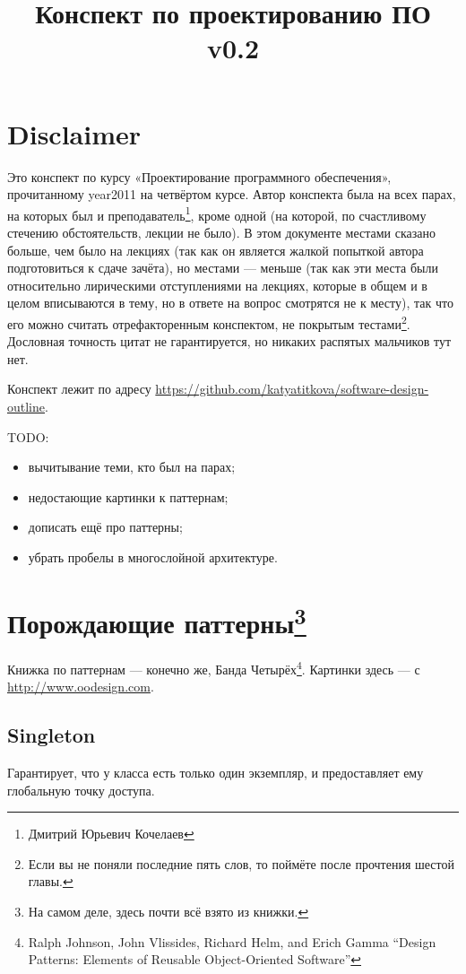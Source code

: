 \documentclass[11pt,a4paper]{article}
\title{Конспект по проектированию ПО \\ \vspace{2 mm} {\large v0.2}}
\date{}
\begin{document}
\maketitle
\tableofcontents

\section{Disclaimer}
Это конспект по курсу «Проектирование программного обеспечения», прочитанному year2011 на четвёртом курсе. Автор конспекта была на всех парах, на которых был и преподаватель\footnote{Дмитрий Юрьевич Кочелаев}, кроме одной (на которой, по счастливому стечению обстоятельств, лекции не было). В этом документе местами сказано больше, чем было на лекциях (так как он является жалкой попыткой автора подготовиться к сдаче зачёта), но местами — меньше (так как эти места были относительно лирическими отступлениями на лекциях, которые в общем и в целом вписываются в тему, но в ответе на вопрос смотрятся не к месту), так что его можно считать отрефакторенным конспектом, не покрытым тестами\footnote{Если вы не поняли последние пять слов, то поймёте после прочтения шестой главы.}. Дословная точность цитат не гарантируется, но никаких распятых мальчиков тут нет.

Конспект лежит по адресу \url{https://github.com/katyatitkova/software-design-outline}.

TODO: 
\begin{itemize}
\item вычитывание теми, кто был на парах;
\item недостающие картинки к паттернам;
\item дописать ещё про паттерны;
\item убрать пробелы в многослойной архитектуре.
\end{itemize}

\section{Порождающие паттерны\footnote{На самом деле, здесь почти всё взято из книжки.}}
Книжка по паттернам — конечно же, Банда Четырёх\footnote{Ralph Johnson, John Vlissides, Richard Helm, and Erich Gamma ``Design Patterns: Elements of Reusable Object-Oriented Software''}. Картинки здесь — с \url{http://www.oodesign.com}.
\subsection{Singleton}
Гарантирует, что у класса есть только один экземпляр, и предоставляет ему глобальную точку доступа.
\end{document}

